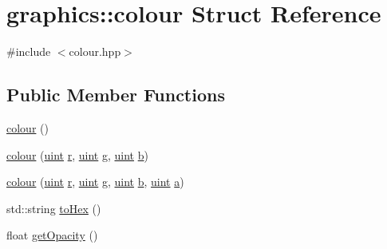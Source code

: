 \hypertarget{structgraphics_1_1colour}{}\section{graphics\+:\+:colour Struct Reference}
\label{structgraphics_1_1colour}


{\ttfamily \#include $<$colour.\+hpp$>$}

\subsection*{Public Member Functions}
\begin{DoxyCompactItemize}
\item 
\hyperlink{structgraphics_1_1colour_a6fdccb3f51bff3bef8ee999503542c3f}{colour} ()
\item 
\hyperlink{structgraphics_1_1colour_a7a2d38c378c3d53453a06eddc84c31fc}{colour} (\hyperlink{types_8h_a91ad9478d81a7aaf2593e8d9c3d06a14}{uint} \hyperlink{structgraphics_1_1colour_a901548bed7ab6d410ba74271870ea733}{r}, \hyperlink{types_8h_a91ad9478d81a7aaf2593e8d9c3d06a14}{uint} \hyperlink{structgraphics_1_1colour_a321b1e11d85e4e3083bf9f80dad24b80}{g}, \hyperlink{types_8h_a91ad9478d81a7aaf2593e8d9c3d06a14}{uint} \hyperlink{structgraphics_1_1colour_a2b9938100a15599b3bb01c344db3d049}{b})
\item 
\hyperlink{structgraphics_1_1colour_af759244ddae761fa62713eb6bf25fa73}{colour} (\hyperlink{types_8h_a91ad9478d81a7aaf2593e8d9c3d06a14}{uint} \hyperlink{structgraphics_1_1colour_a901548bed7ab6d410ba74271870ea733}{r}, \hyperlink{types_8h_a91ad9478d81a7aaf2593e8d9c3d06a14}{uint} \hyperlink{structgraphics_1_1colour_a321b1e11d85e4e3083bf9f80dad24b80}{g}, \hyperlink{types_8h_a91ad9478d81a7aaf2593e8d9c3d06a14}{uint} \hyperlink{structgraphics_1_1colour_a2b9938100a15599b3bb01c344db3d049}{b}, \hyperlink{types_8h_a91ad9478d81a7aaf2593e8d9c3d06a14}{uint} \hyperlink{structgraphics_1_1colour_a3f5cc996c0653fe47c33e67cc9f2731c}{a})
\item 
std\+::string \hyperlink{structgraphics_1_1colour_abc91f344c55a14f8cda34080a01b030d}{to\+Hex} ()
\item 
float \hyperlink{structgraphics_1_1colour_a712e0263c4f5b6e90ba8e20bd1a305dc}{get\+Opacity} ()
\end{DoxyCompactItemize}
